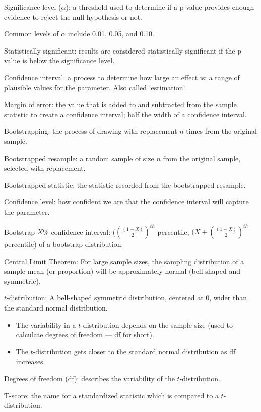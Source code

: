 \documentclass[
]{report}
\providecommand{\tightlist}{%
  \setlength{\itemsep}{0pt}\setlength{\parskip}{0pt}}
\newcommand{\rgi}{\hspace{24pt}}  %
\begin{document}
Significance level (\(\alpha\)): a threshold used to determine if a p-value provides enough evidence to reject the null hypothesis or not.

\rgi Common levels of \(\alpha\) include 0.01, 0.05, and 0.10.

Statistically significant: results are considered statistically significant if the p-value is below the significance level.

Confidence interval: a process to determine how large an effect is; a range of plausible values for the parameter. Also called `estimation'.

Margin of error: the value that is added to and subtracted from the sample statistic to create a confidence interval; half the width of a confidence interval.

Bootstrapping: the process of drawing with replacement \(n\) times from the original sample.

Bootstrapped resample: a random sample of size \(n\) from the original sample, selected with replacement.

Bootstrapped statistic: the statistic recorded from the bootstrapped resample.

Confidence level: how confident we are that the confidence interval will capture the parameter.

Bootstrap \(X\)\% confidence interval: (\((\frac{(1-X)}{2})^{th}\) percentile, \((X+(\frac{(1-X)}{2})^{th}\) percentile) of a bootstrap distribution.

Central Limit Theorem: For large sample sizes, the sampling distribution of a sample mean (or proportion) will be approximately normal (bell-shaped and symmetric).

\(t\)-distribution: A bell-shaped symmetric distribution, centered at 0, wider than the standard normal distribution.

\begin{itemize}
\tightlist
\item
  The variability in a \(t\)-distribution depends on the sample size (used to calculate degrees of freedom --- df for short).
\item
  The \(t\)-distribution gets closer to the standard normal distribution as df increases.
\end{itemize}

Degrees of freedom (df): describes the variability of the \(t\)-distribution.

T-score: the name for a standardized statistic which is compared to a \(t\)-distribution.
\end{document}
